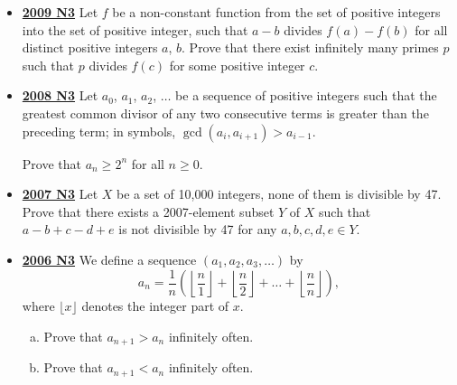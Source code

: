\documentclass[11pt]{scrartcl}
\begin{document}
\begin{itemize}[leftmargin=*]
\item \href{https://artofproblemsolving.com/community/c6h355797p1932942}{\textbf{2009 N3}} 	Let $f$ be a non-constant function from the set of positive integers into the set of positive integer, such that $a-b$ divides $f(a)-f(b)$ for all distinct positive integers $a$, $b$. Prove that there exist infinitely many primes $p$ such that $p$ divides $f(c)$ for some positive integer $c$.
\item \href{https://artofproblemsolving.com/community/c6h287871p1555931}{\textbf{2008 N3}} 	Let $ a_0$, $ a_1$, $ a_2$, $ \dots$ be a sequence of positive integers such that the greatest common divisor of any two consecutive terms is greater than the preceding term; in symbols, $ \gcd (a_i, a_{i + 1}) > a_{i - 1}$. 

Prove that $ a_n\geqslant  2^n$ for all $ n\geqslant  0$.
\item \href{https://artofproblemsolving.com/community/c6h214713p1187204}{\textbf{2007 N3}} Let $ X$ be a set of 10,000 integers, none of them is divisible by 47. Prove that there exists a 2007-element subset $ Y$ of $ X$ such that $ a - b + c - d + e$ is not divisible by 47 for any $ a,b,c,d,e \in Y.$
\item \href{https://artofproblemsolving.com/community/c6h130811p741367}{\textbf{2006 N3}} 	We define a sequence $ \left(a_{1},a_{2},a_{3},\dots \right)$ by
\[ a_{n} = \frac {1}{n}\left(\left\lfloor\frac {n}{1}\right\rfloor + \left\lfloor\frac {n}{2}\right\rfloor + \dots + \left\lfloor\frac {n}{n}\right\rfloor\right),
\]where $\lfloor x\rfloor$ denotes the integer part of $x$.
\begin{enumerate}[(a)]
    \item Prove that $a_{n+1}>a_n$ infinitely often. 
    \item Prove that $a_{n+1}<a_n$ infinitely often.
\end{enumerate}

\end{itemize}


















\newpage






\newpage
\newpage
\end{document}
